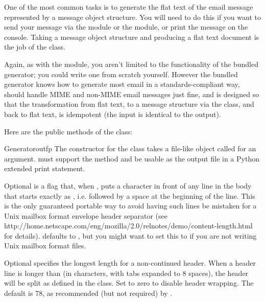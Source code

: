 
One of the most common tasks is to generate the flat text of the email
message represented by a message object structure.  You will need to do
this if you want to send your message via the 
module or the  module, or print the message on the
console.  Taking a message object structure and producing a flat text
document is the job of the  class.

Again, as with the  module, you aren't limited
to the functionality of the bundled generator; you could write one
from scratch yourself.  However the bundled generator knows how to
generate most email in a standards-compliant way, should handle MIME
and non-MIME email messages just fine, and is designed so that the
transformation from flat text, to a message structure via the
 class, and back to flat text, is idempotent (the input
is identical to the output).

Here are the public methods of the  class:

\begin{classdesc}{Generator}{outfp}
The constructor for the  class takes a file-like
object called  for an argument.   must support
the  method and be usable as the output file in a
Python extended print statement.

Optional  is a flag that, when , puts a
\samp{>} character in front of any line in the body that starts exactly as
, i.e.  followed by a space at the beginning of the
line.  This is the only guaranteed portable way to avoid having such
lines be mistaken for a Unix mailbox format envelope header separator (see
{http://home.netscape.com/eng/mozilla/2.0/relnotes/demo/content-length.html}
for details).   defaults to , but you
might want to set this to  if you are not writing Unix
mailbox format files.

Optional  specifies the longest length for a
non-continued header.  When a header line is longer than
 (in characters, with tabs expanded to 8 spaces),
the header will be split as defined in the 
class.  Set to zero to disable header wrapping.  The default is 78, as
recommended (but not required) by .
\end{classdesc}

